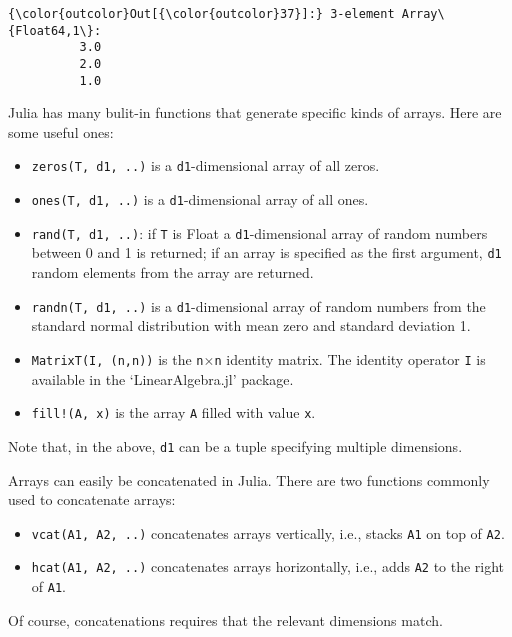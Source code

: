 \documentclass[11pt]{article}
\providecommand{\tightlist}{%
      \setlength{\itemsep}{0pt}\setlength{\parskip}{0pt}}
\begin{document}
\begin{Verbatim}[commandchars=\\\{\}]
{\color{outcolor}Out[{\color{outcolor}37}]:} 3-element Array\{Float64,1\}:
          3.0
          2.0
          1.0
\end{Verbatim}
            
    Julia has many bulit-in functions that generate specific kinds of
arrays. Here are some useful ones:

\begin{itemize}
\tightlist
\item
  \texttt{zeros(T,\ d1,\ ..)} is a \texttt{d1}-dimensional array of all
  zeros.
\item
  \texttt{ones(T,\ d1,\ ..)} is a \texttt{d1}-dimensional array of all
  ones.
\item
  \texttt{rand(T,\ d1,\ ..)}: if \texttt{T} is Float a
  \texttt{d1}-dimensional array of random numbers between 0 and 1 is
  returned; if an array is specified as the first argument, \texttt{d1}
  random elements from the array are returned.
\item
  \texttt{randn(T,\ d1,\ ..)} is a \texttt{d1}-dimensional array of
  random numbers from the standard normal distribution with mean zero
  and standard deviation 1.
\item
  \texttt{MatrixT(I,\ (n,n))} is the \texttt{n}\(\times\)\texttt{n}
  identity matrix. The identity operator \texttt{I} is available in the
  `LinearAlgebra.jl' package.
\item
  \texttt{fill!(A,\ x)} is the array \texttt{A} filled with value
  \texttt{x}.
\end{itemize}

Note that, in the above, \texttt{d1} can be a tuple specifying multiple
dimensions.

Arrays can easily be concatenated in Julia. There are two functions
commonly used to concatenate arrays:

\begin{itemize}
\tightlist
\item
  \texttt{vcat(A1,\ A2,\ ..)} concatenates arrays vertically, i.e.,
  stacks \texttt{A1} on top of \texttt{A2}.
\item
  \texttt{hcat(A1,\ A2,\ ..)} concatenates arrays horizontally, i.e.,
  adds \texttt{A2} to the right of \texttt{A1}.
\end{itemize}

Of course, concatenations requires that the relevant dimensions match.
\end{document}
